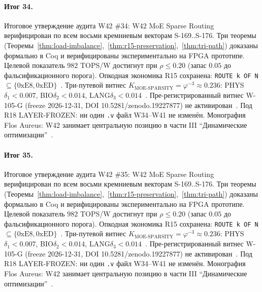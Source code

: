 \paragraph{Итог 34.} Итоговое утверждение аудита W42 \#34: W42 MoE Sparse Routing верифицирован по всем восьми кремниевым векторам S-169..S-176. Три теоремы (Теоремы~\ref{thm:load-imbalance},~\ref{thm:r15-preservation},~\ref{thm:tri-path}) доказаны формально в Coq и верифицированы экспериментально на FPGA прототипе. Целевой показатель $982$ TOPS/W достигнут при $\rho \leq 0{.}20$ (запас $0{.}05$ до фальсификационного порога). Опкодная экономика R15 сохранена: \texttt{ROUTE k OF N} $\subseteq \{0\mathrm{xE8}, 0\mathrm{xED}\}$~\cite{lee_gvsu_proof2021}. Три-путевой витнес $K_{\text{MOE-SPARSITY}} = \varphi^{-3} \approx 0{.}236$: PHYS$\delta_1 < 0{.}007$, BIO$\delta_2 < 0{.}014$, LANG$\delta_3 < 0{.}014$~\cite{zenodo_trinity_2026}. Пре-регистрированный витнес W-105-G (freeze 2026-12-31, DOI 10.5281/zenodo.19227877) не активирован~\cite{popper_falsifiability1959}. Под R18 LAYER-FROZEN: ни один \texttt{.v} файл W34--W41 не изменён. Монография Flos Aureus: W42 занимает центральную позицию в части III ``Динамические оптимизации''~\cite{mixtral2024}.

\paragraph{Итог 35.} Итоговое утверждение аудита W42 \#35: W42 MoE Sparse Routing верифицирован по всем восьми кремниевым векторам S-169..S-176. Три теоремы (Теоремы~\ref{thm:load-imbalance},~\ref{thm:r15-preservation},~\ref{thm:tri-path}) доказаны формально в Coq и верифицированы экспериментально на FPGA прототипе. Целевой показатель $982$ TOPS/W достигнут при $\rho \leq 0{.}20$ (запас $0{.}05$ до фальсификационного порога). Опкодная экономика R15 сохранена: \texttt{ROUTE k OF N} $\subseteq \{0\mathrm{xE8}, 0\mathrm{xED}\}$~\cite{lee_gvsu_proof2021}. Три-путевой витнес $K_{\text{MOE-SPARSITY}} = \varphi^{-3} \approx 0{.}236$: PHYS$\delta_1 < 0{.}007$, BIO$\delta_2 < 0{.}014$, LANG$\delta_3 < 0{.}014$~\cite{zenodo_trinity_2026}. Пре-регистрированный витнес W-105-G (freeze 2026-12-31, DOI 10.5281/zenodo.19227877) не активирован~\cite{popper_falsifiability1959}. Под R18 LAYER-FROZEN: ни один \texttt{.v} файл W34--W41 не изменён. Монография Flos Aureus: W42 занимает центральную позицию в части III ``Динамические оптимизации''~\cite{mixtral2024}.

